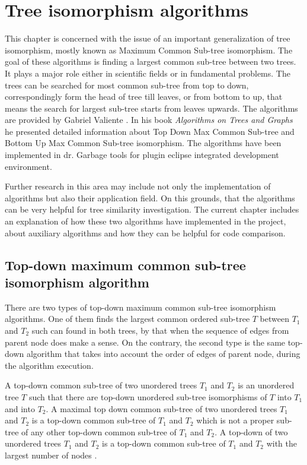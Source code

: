 \documentclass{report}
\begin{document}
\chapter{Tree isomorphism algorithms}
\label{cha:algorithms-to-compare}

This chapter is concerned with the issue of an important generalization of tree isomorphism, mostly known as Maximum Common Sub-tree isomorphism. The goal of these algorithms is finding a largest common sub-tree between two trees. It plays a major role either in scientific fields or in fundamental problems. The trees can be searched for most common sub-tree from top to down, correspondingly form the head of tree till leaves, or from bottom to up, that means the search for largest sub-tree starts from leaves upwards. The algorithms are provided by Gabriel Valiente \cite{valiente}. In his book \emph{Algorithms on Trees and Graphs} he presented detailed information about Top Down Max Common Sub-tree and Bottom Up Max Common Sub-tree isomorphism. The algorithms have been implemented in dr. Garbage tools for plugin eclipse integrated development environment. 

Further research in this area may include not only the implementation of algorithms but also their application field. On this grounds, that the algorithms can be very helpful for tree similarity investigation. The current chapter includes an explanation of how these two algorithms have implemented in the project, about auxiliary algorithms and how they can be helpful for code comparison.

\section{Top-down maximum common sub-tree isomorphism algorithm}
\label{sec:topdown}

There are two types of top-down maximum common sub-tree isomorphism algorithms. One of them finds the largest common ordered sub-tree $T$ between $ T_{1}$ and $ T_{2}$ such can found in both trees, by that when the sequence of edges from parent node does make a sense. On the contrary, the second type is the same top-down algorithm that takes into account the order of edges of parent node, during the algorithm execution. 

A top-down common sub-tree of two unordered trees $ T_{1}$ and $ T_{2 }$ is an unordered tree $T$ such that there are top-down unordered sub-tree isomorphisms of $ T$ into $ T_{1}$ and into $ T_{2}$. A maximal top down common sub-tree of two unordered  trees $ T_{1}$ and $ T_{2}$ is a top-down common sub-tree of $ T_{1}$ and $ T_{2}$ which is not a proper sub-tree of any other top-down common sub-tree of $ T_{1}$ and $ T_{2}$. A top-down of two unordered trees $ T_{1}$ and $ T_{2}$ is a top-down common sub-tree of $ T_{1}$ and $ T_{2}$ with the largest number of nodes \cite{valiente}.
\end{document}
